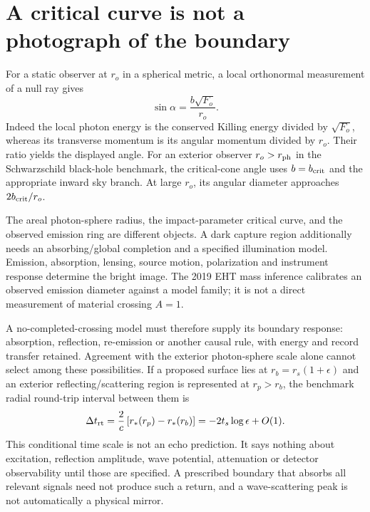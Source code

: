 \documentclass[10pt,twocolumn,letterpaper]{article}
\begin{document}
\section{A critical curve is not a photograph of the boundary}
For a static observer at $r_o$ in a spherical metric, a local orthonormal
measurement of a null ray gives
\begin{equation}
 \sin\alpha=\frac{b\sqrt{F_o}}{r_o}.
 \label{eq:finite-shadow-angle}
\end{equation}
Indeed the local photon energy is the conserved Killing energy divided
by $\sqrt{F_o}$, whereas its transverse momentum is its angular
momentum divided by $r_o$. Their ratio yields the displayed angle.
For an exterior observer $r_o>r_{\rm ph}$ in the Schwarzschild
black-hole benchmark, the critical-cone angle uses
$b=b_{\rm crit}$ and the appropriate inward sky branch. At large
$r_o$, its angular diameter approaches $2b_{\rm crit}/r_o$.

The areal photon-sphere radius, the impact-parameter critical curve,
and the observed emission ring are different objects. A dark capture
region additionally needs an absorbing/global completion and a specified
illumination model. Emission, absorption, lensing, source motion,
polarization and instrument response determine the bright image.
The 2019 EHT mass inference calibrates an observed emission diameter
against a model family; it is not a direct measurement of material
crossing $A=1$.\cite{eht,gralla}

A no-completed-crossing model must therefore supply its boundary
response: absorption, reflection, re-emission or another causal rule,
with energy and record transfer retained. Agreement with the exterior
photon-sphere scale alone cannot select among these possibilities.
If a proposed surface lies at $r_b=r_s(1+\epsilon)$ and an exterior
reflecting/scattering region is represented at $r_p>r_b$, the benchmark
radial round-trip interval between them is
\begin{equation}
 \Delta t_{\rm rt}=\frac2c\left[r_*(r_p)-r_*(r_b)\right]
 =-2t_s\log\epsilon+O(1).
\end{equation}
This conditional time scale is not an echo prediction. It says nothing
about excitation, reflection amplitude, wave potential, attenuation or
detector observability until those are specified. A prescribed
boundary that absorbs all relevant signals need not produce such a
return, and a wave-scattering peak is not automatically a physical
mirror.
\end{document}
